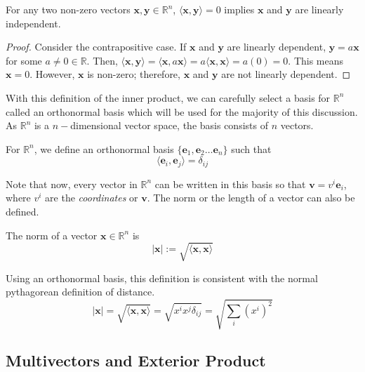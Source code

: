 \documentclass{article}
\numberwithin{equation}{section}
\newcommand{\R}{\mathbb{R}}
\newcommand{\ve}{\mathbf}
\begin{document}
\begin{proposition}
    For any two non-zero vectors $\ve x,\ve y\in\R^n$, $\langle \ve x,\ve y\rangle=0$ implies $\ve x$ and $\ve y$ are linearly independent.
    \begin{proof}
        Consider the contrapositive case. If $\ve x$ and $\ve y$ are linearly dependent, $\ve y=a\ve x$ for some $a\neq 0\in\R$. Then, $\langle \ve x,\ve y\rangle=\langle \ve x,a\ve x\rangle=a\langle\ve x,\ve x\rangle=a(0)=0$. This means $\ve x=0$. However, $\ve x$ is non-zero; therefore, $\ve x$ and $\ve y$ are not linearly dependent.
    \end{proof}
\end{proposition}

With this definition of the inner product, we can carefully select a basis for $\R^n$ called an orthonormal basis which will be used for the majority of this discussion. As $\R^n$ is a $n-$dimensional vector space, the basis consists of $n$ vectors.
\begin{definition}
    For $\R^n$, we define an orthonormal basis $\{\ve e_1,\ve e_2\dots\ve e_n\}$ such that
    \begin{equation}
        \langle \ve e_i,\ve e_j\rangle=\delta_{ij}\label{stdbasis}
    \end{equation}
\end{definition}
Note that now, every vector in $\R^n$ can be written in this basis so that $\ve v=v^i\ve e_i$, where $v^i$ are the \textit{coordinates} or $\ve v$. The norm or the length of a vector can also be defined.
\begin{definition}
    The norm of a vector $\ve x\in\R^n$ is 
    \begin{equation}
        |\ve x|:=\sqrt{\langle\ve x,\ve x\rangle}\label{norm}
    \end{equation}
\end{definition}

Using an orthonormal basis, this definition is consistent with the normal pythagorean definition of distance. 
\begin{equation}
    |\ve x|=\sqrt{\langle \ve x,\ve x\rangle}=\sqrt{x^ix^j\delta_{ij}}=\sqrt{\sum_i(x^i)^2}
\end{equation}

\subsection{Multivectors and Exterior Product}
\end{document}
